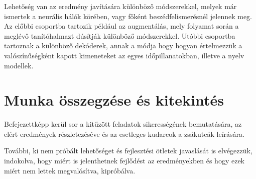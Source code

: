 Lehetőség van az eredmény javítására különböző módszerekkel, melyek már ismertek a neurális hálók körében, vagy főként beszédfelismerésnél jelennek meg. Az előbbi csoportba tartozik például az augmentálás, mely folyamat során a meglévő tanítóhalmazt dúsítják különböző módszerekkel. Utóbbi csoportba tartoznak a különböző dekóderek, annak a módja hogy hogyan értelmezzük a valószínűségként kapott kimeneteket az egyes időpillanatokban, illetve a nyelv modellek.

\section{Munka összegzése és kitekintés}

Befejezettképp kerül sor a kitűzött feladatok sikerességének bemutatására, az elért eredmények részletezéséve és az esetleges kudarcok a zsákutcák leírására.

További, ki nem próbált lehetőséget és fejlesztési ötletek javaslását is elvégezzük, indokolva, hogy miért is jelenthetnek fejlődést az eredményekben és hogy ezek miért nem lettek megvalósítva, kipróbálva.